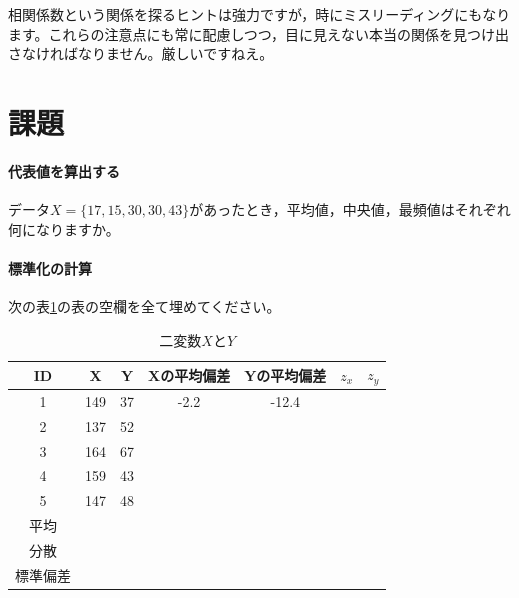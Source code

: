 \documentclass{ltjsbook}
\begin{document}
相関係数という関係を探るヒントは強力ですが，時にミスリーディングにもなります。これらの注意点にも常に配慮しつつ，目に見えない本当の関係を見つけ出さなければなりません。厳しいですねえ。

\section{課題}
\paragraph{代表値を算出する}データ$X = \{17 , 15,  30 , 30, 43 \}$があったとき，平均値，中央値，最頻値はそれぞれ何になりますか。
\paragraph{標準化の計算}次の表\ref{tbl::04_05}の表の空欄を全て埋めてください。

\begin{table}[ht]
    \centering
    \caption{二変数$X$と$Y$}
    \begin{tabular}{ccccccc}
      \hline
     ID & X & Y & Xの平均偏差 & Yの平均偏差 & $z_x$ & $z_y$\\ 
      \hline
      1 & 149 & 37 & -2.2 & -12.4 &  & \\
      2 & 137 & 52 &  &  &  & \\ 
      3 & 164 & 67 &  &  &  & \\ 
      4 & 159 & 43 &  &  &  & \\ 
      5 & 147 & 48 &  &  &  & \\ 
       \hline
       平均& & &  &  & &\\
       分散& & &  &  & &\\
       標準偏差& & &  & & & \\\hline
    \end{tabular}
    \label{tbl::04_05}
    \end{table}
\end{document}

